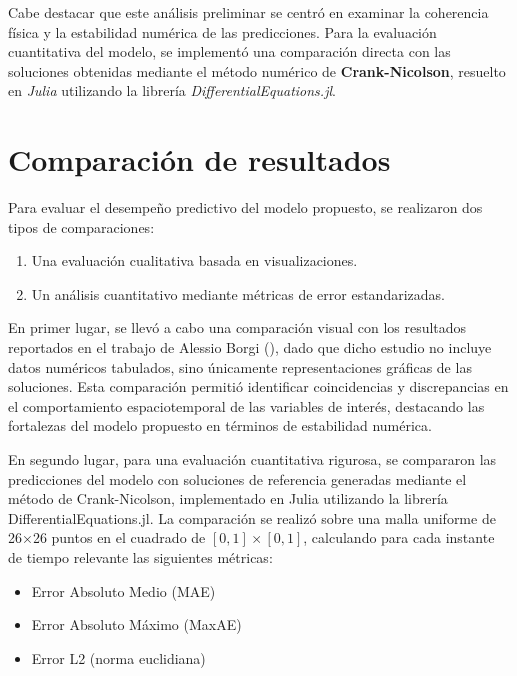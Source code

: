\documentclass[
  spanish,
  us-letterpaper,
  DIV=11,
  numbers=noendperiod]{scrreprt}
\providecommand{\tightlist}{%
  \setlength{\itemsep}{0pt}\setlength{\parskip}{0pt}}
\theoremstyle{definition}
\theoremstyle{plain}
\theoremstyle{remark}
\begin{document}
Cabe destacar que este análisis preliminar se centró en examinar la
coherencia física y la estabilidad numérica de las predicciones. Para la
evaluación cuantitativa del modelo, se implementó una comparación
directa con las soluciones obtenidas mediante el método numérico de
\textbf{Crank-Nicolson}, resuelto en \emph{Julia} utilizando la librería
\emph{DifferentialEquations.jl}.

\section{Comparación de resultados}\label{comparaciuxf3n-de-resultados}

Para evaluar el desempeño predictivo del modelo propuesto, se realizaron
dos tipos de comparaciones:

\begin{enumerate}
\def\labelenumi{\arabic{enumi}.}
\tightlist
\item
  Una evaluación cualitativa basada en visualizaciones.
\item
  Un análisis cuantitativo mediante métricas de error estandarizadas.
\end{enumerate}

En primer lugar, se llevó a cabo una comparación visual con los
resultados reportados en el trabajo de Alessio Borgi
(), dado que dicho estudio no incluye
datos numéricos tabulados, sino únicamente representaciones gráficas de
las soluciones. Esta comparación permitió identificar coincidencias y
discrepancias en el comportamiento espaciotemporal de las variables de
interés, destacando las fortalezas del modelo propuesto en términos de
estabilidad numérica.

En segundo lugar, para una evaluación cuantitativa rigurosa, se
compararon las predicciones del modelo con soluciones de referencia
generadas mediante el método de Crank-Nicolson, implementado en Julia
utilizando la librería DifferentialEquations.jl. La comparación se
realizó sobre una malla uniforme de 26×26 puntos en el cuadrado de
\([0,1]\times[0,1]\), calculando para cada instante de tiempo relevante
las siguientes métricas:

\begin{itemize}
\tightlist
\item
  Error Absoluto Medio (MAE)
\item
  Error Absoluto Máximo (MaxAE)
\item
  Error L2 (norma euclidiana)
\end{itemize}
\end{document}
